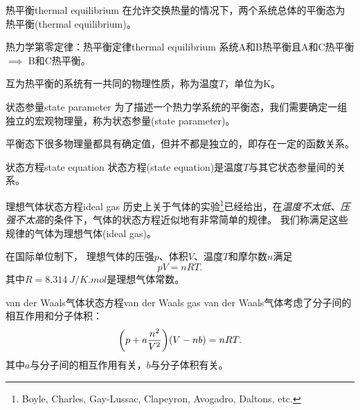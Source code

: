 \begin{definition}
	{热平衡}{thermal equilibrium}
	在允许交换热量的情况下，两个系统总体的平衡态为热平衡(thermal equilibrium)。
\end{definition}

\begin{theorem}{热力学第零定律：热平衡定律}{thermal equilibrium}
	系统A和B热平衡且A和C热平衡$\implies$ B和C热平衡。
\end{theorem}

\begin{corollary}
	互为热平衡的系统有一共同的物理性质，称为温度$T$，单位为K。
\end{corollary}

\begin{definition}
	{状态参量}{state parameter}
	为了描述一个热力学系统的平衡态，我们需要确定一组独立的宏观物理量，称为状态参量(state parameter)。
\end{definition}


\begin{remark}
	平衡态下很多物理量都具有确定值，但并不都是独立的，即存在一定的函数关系。
\end{remark}

\begin{definition}{状态方程}{state equation}
	状态方程(state equation)是温度$T$与其它状态参量间的关系。
\end{definition}

\begin{example}
	{理想气体状态方程}{ideal gas}
	历史上关于气体的实验\footnote{Boyle, Charles, Gay-Lussac, Clapeyron, Avogadro, Daltons, etc.}已经给出，在\textit{温度不太低、压强不太高}的条件下，气体的状态方程近似地有非常简单的规律。
	我们称满足这些规律的气体为理想气体(ideal gas)。

	在国际单位制下，
	理想气体的压强$p$、体积$V$、温度$T$和摩尔数$n$满足
	\begin{equation}
		\label{eq:pV=nRT}
		pV=nRT.
	\end{equation}
	其中$R=\SI{8.314}{J/K.mol}$是理想气体常数。
\end{example}

\begin{example}
	{van der Waals气体状态方程}{van der Waals gas}
	van der Waals气体考虑了分子间的相互作用和分子体积：
	\begin{equation}
		\label{eq:vdW}
		\biggl(p+a\frac{n^2}{V^2}\biggr)(V-nb)=nRT.
	\end{equation}
	其中$a$与分子间的相互作用有关，$b$与分子体积有关。
\end{example}

